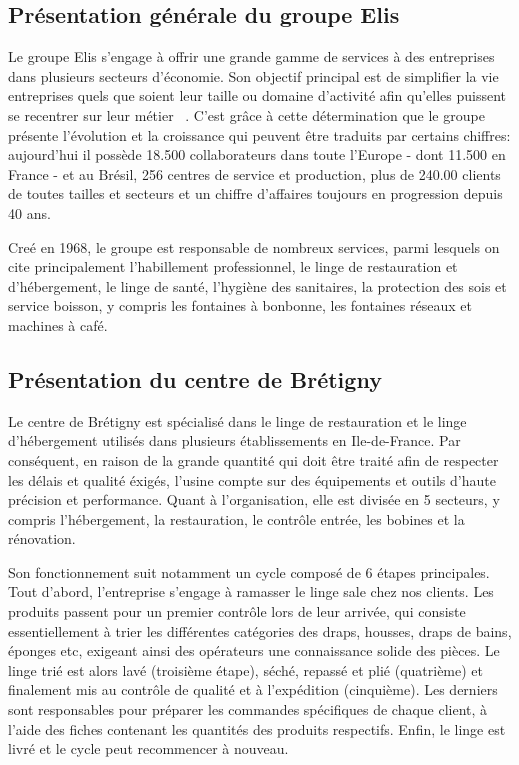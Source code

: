 \documentclass{article}
\begin{document}
\subsection{Présentation générale du groupe Elis}

Le groupe Elis s'engage à offrir une grande gamme de services à des entreprises
dans plusieurs secteurs d'économie. Son objectif principal est de \og
simplifier la vie entreprises quels que soient leur taille ou domaine
d'activité afin qu'elles puissent se recentrer sur leur métier \fg~. C'est
grâce à cette détermination que le groupe présente l'évolution et la croissance
qui peuvent être traduits par certains chiffres: aujourd'hui il possède 18.500
collaborateurs dans toute l'Europe - dont 11.500 en France - et au Brésil, 256
centres de service et production, plus de 240.00 clients de toutes tailles et
secteurs et un chiffre d'affaires toujours en  progression depuis 40 ans.

\vspace{12pt}

Creé en 1968, le groupe est responsable de nombreux services, parmi
lesquels on cite principalement l'habillement professionnel, le linge de
restauration et d'hébergement, le linge de santé, l'hygiène des sanitaires, la
protection des sois et service boisson, y compris les fontaines à bonbonne, les
fontaines réseaux et machines à café.

\subsection{Présentation du centre de Brétigny}

Le centre de Brétigny est spécialisé dans le linge de restauration et le linge
d'hébergement utilisés dans plusieurs établissements en Ile-de-France. Par
con\-séquent, en raison de la grande quantité qui doit être traité afin
de respecter les délais et qualité éxigés, l'usine compte
sur des équipements et outils d'haute précision et performance. Quant à
l'organisation, elle est divisée en 5 secteurs, y compris l'hébergement, la
restauration, le contrôle entrée, les bobines et la rénovation.

\vspace{12pt}

Son fonctionnement suit notamment un cycle composé de 6 étapes principales.
Tout d'abord, l'entreprise s'engage à ramasser le linge sale chez nos clients.
Les produits passent pour un premier contrôle lors de leur arrivée, qui
consiste essentiellement à trier les différentes catégories des draps, housses,
draps de bains, éponges etc, exigeant ainsi des opérateurs une connaissance
solide des pièces. Le linge trié est alors lavé (troisième étape), séché,
repassé et plié (quatrième) et finalement mis au contrôle de qualité et à
l'expédition (cinquième). Les derniers sont responsables pour préparer les
commandes spécifiques de chaque client, à l'aide des fiches contenant les
quantités des produits respectifs. Enfin, le linge est livré et le cycle peut
recommencer à nouveau.
\end{document}
